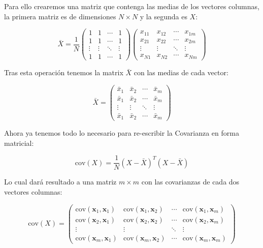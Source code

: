 \documentclass[	DIV=calc,%
							paper=a4,%
							fontsize=11pt]{scrartcl}	 					%
\begin{document}
\begin{enumerate}
		Para ello crearemos una matriz que contenga las medias de los vectores columnas, la primera matriz es de dimensiones $N\times N$ y la segunda es $X$:

		\[
		\bar{X} =
			\frac{1}{N}
			\begin{pmatrix}
				1 	& 1 	& \cdots & 1 \\
				1 	& 1 	& \cdots & 1 \\
				\vdots          		& \vdots	& \ddots & \vdots \\
				1 	& 1 	& \cdots & 1
			\end{pmatrix}
			\begin{pmatrix}
				x_{11} & x_{12} & \cdots & x_{1m} \\
				x_{21} & x_{22} & \cdots & x_{2m} \\
				\vdots          & \vdots & \ddots & \vdots \\
				x_{N1} & x_{N2} & \cdots & x_{Nm}
			\end{pmatrix}
		\]

		Tras esta operación tenemos la matrix $\bar{X}$ con las medias de cada vector:

		\[
			\bar{X}=
				\begin{pmatrix}
					\bar{x}_1 	& \bar{x}_2 	& \cdots & \bar{x}_m \\
					\bar{x}_1 	& \bar{x}_2 	& \cdots & \bar{x}_m \\
					\vdots          		& \vdots 			 & \ddots & \vdots \\
					\bar{x}_1 	& \bar{x}_2 	& \cdots & \bar{x}_m
				\end{pmatrix}
		\]

		Ahora ya tenemos todo lo necesario para re-escribir la Covarianza en forma matricial:

		\[
			\mathrm{cov}(X) = \frac{1}{N}\left( X - \bar{X} \right)^T\left( X - \bar{X} \right)
		\]

		Lo cual dará resultado a una matriz $m\times m$ con las covarianzas de cada dos vectores columnas:

		\[
			\mathrm{cov}(X) =
			\begin{pmatrix}
				\mathrm{cov}(\mathbf{x}_1, \mathbf{x}_1) 	& \mathrm{cov}(\mathbf{x}_1, \mathbf{x}_2)	& \cdots 	&  \mathrm{cov}(\mathbf{x}_1, \mathbf{x}_m)	\\
				\mathrm{cov}(\mathbf{x}_2, \mathbf{x}_1)	& \mathrm{cov}(\mathbf{x}_2, \mathbf{x}_2)	& \cdots 	&  \mathrm{cov}(\mathbf{x}_2, \mathbf{x}_m) \\
				\vdots          													& \vdots 			 															& \ddots 	&	 \vdots 																	\\
				\mathrm{cov}(\mathbf{x}_m, \mathbf{x}_1) 	& \mathrm{cov}(\mathbf{x}_m, \mathbf{x}_2)	& \cdots 	& \mathrm{cov}(\mathbf{x}_m, \mathbf{x}_m)
			\end{pmatrix}
		\]


\end{enumerate}
\end{document}
